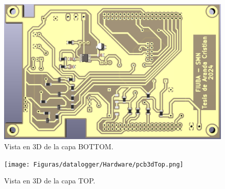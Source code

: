 \begin{figure}[H]
    \centering
    \includegraphics[width=0.95\linewidth]{Figuras/datalogger/Hardware/pcb3dBottom.png}
    \caption{Vista en 3D de la capa BOTTOM.}
    \label{fig:pcb3dBottom}
\end{figure}


\begin{figure}[H]
    \centering
    \texttt{[image: Figuras/datalogger/Hardware/pcb3dTop.png]}
    \caption{Vista en 3D de la capa TOP.}
    \label{fig:pcb3dTop}
\end{figure}

